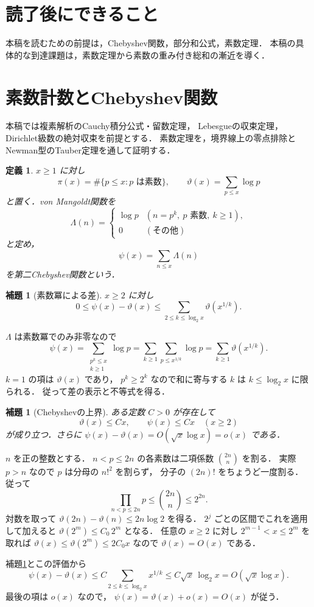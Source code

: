 \documentclass[a5paper,10pt,onecolumn]{jsarticle}
\makeatletter
\theoremstyle{mathnotetheorem}
\newtheorem{definition}[theorem]{定義}
\newtheorem{lemma}[theorem]{補題}
\renewcommand{\proofname}{証明}
\renewenvironment{proof}[1][\proofname]{%
  \par\pushQED{\qed}\normalfont\topsep4\p@\@plus2\p@\relax
  \trivlist\item[\hskip\labelsep\bfseries #1]\ignorespaces
}{\popQED\endtrivlist\@endpefalse}
\makeatother
\begin{document}
\section*{読了後にできること}
本稿を読むための前提は，Chebyshev関数，部分和公式，素数定理．
本稿の具体的な到達課題は，素数定理から素数の重み付き総和の漸近を導く．

\section{素数計数とChebyshev関数}

本稿では複素解析のCauchy積分公式・留数定理，
Lebesgueの収束定理，Dirichlet級数の絶対収束を前提とする．
素数定理を，境界線上の零点排除と
Newman型のTauber定理を通して証明する．

\begin{definition}
$x\ge1$ に対し
\[
 \pi(x)=\#\{p\le x:p\text{ は素数}\},\qquad
 \vartheta(x)=\sum_{p\le x}\log p
\]
と置く．von Mangoldt関数を
\[
 \Lambda(n)=
 \begin{cases}
 \log p&(n=p^k,\ p\text{ 素数},\ k\ge1),\\
 0&(\text{その他})
 \end{cases}
\]
と定め，
\[
 \psi(x)=\sum_{n\le x}\Lambda(n)
 \]
を第二Chebyshev関数という．
\end{definition}

\begin{lemma}[素数冪による差]\label{lem:prime-powers}
$x\ge2$ に対し
\[
 0\le\psi(x)-\vartheta(x)
 \le\sum_{2\le k\le\log_2x}\vartheta(x^{1/k}).
\]
\end{lemma}
\begin{proof}
$\Lambda$ は素数冪でのみ非零なので
\[
 \psi(x)=\sum_{\substack{p^k\le x\\k\ge1}}\log p
 =\sum_{k\ge1}\sum_{p\le x^{1/k}}\log p
 =\sum_{k\ge1}\vartheta(x^{1/k}).
\]
$k=1$ の項は $\vartheta(x)$ であり，
$p^k\ge2^k$ なので和に寄与する $k$ は
$k\le\log_2x$ に限られる．
従って差の表示と不等式を得る．
\end{proof}

\begin{lemma}[Chebyshevの上界]\label{lem:chebyshev}
ある定数 $C>0$ が存在して
\[
 \vartheta(x)\le Cx,\qquad
 \psi(x)\le Cx
 \quad(x\ge2)
\]
が成り立つ．さらに
$\psi(x)-\vartheta(x)=O(\sqrt x\log x)=o(x)$ である．
\end{lemma}
\begin{proof}
$n$ を正の整数とする．
$n<p\le2n$ の各素数は二項係数
$\binom{2n}n$ を割る．
実際 $p>n$ なので $p$ は分母の $n!^2$ を割らず，
分子の $(2n)!$ をちょうど一度割る．
従って
\[
 \prod_{n<p\le2n}p\le\binom{2n}n\le2^{2n}.
\]
対数を取って
$\vartheta(2n)-\vartheta(n)\le2n\log2$ を得る．
$2^j$ ごとの区間でこれを適用して加えると
$\vartheta(2^m)\le C_0\,2^m$ となる．
任意の $x\ge2$ に対し
$2^{m-1}<x\le2^m$ を取れば
$\vartheta(x)\le\vartheta(2^m)\le2C_0x$ なので
$\vartheta(x)=O(x)$ である．

補題\ref{lem:prime-powers}とこの評価から
\[
 \psi(x)-\vartheta(x)
 \le C\sum_{2\le k\le\log_2x}x^{1/k}
 \le C\sqrt x\,\log_2x
 =O(\sqrt x\log x).
\]
最後の項は $o(x)$ なので，
$\psi(x)=\vartheta(x)+o(x)=O(x)$ が従う．
\end{proof}
\end{document}
